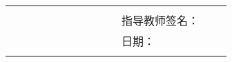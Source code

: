 \begin{table}[h]
\begin{tabular}{|p{0.2\linewidth}p{0.2\linewidth}p{0.2\linewidth}p{0.2\linewidth}|}
		\multicolumn{4}{|l|}{}                                                                                                 \\
		                               &                        & \multicolumn{2}{l|}{指导教师签名：}                          \\
		                               &                        & \multicolumn{2}{l|}{日期：}                                    \\
		\multicolumn{4}{|l|}{}                                                                                                 \\
		\hline
	\end{tabular}
\end{table}
